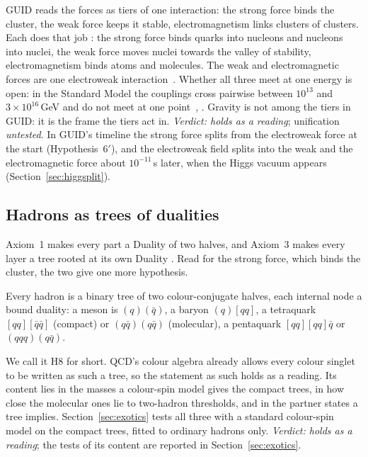 GUID reads the forces as tiers of one interaction: the strong force binds the cluster, the weak force keeps it stable, electromagnetism
links clusters of clusters. Each does that job \tagP: the strong force binds quarks into nucleons and nucleons into nuclei, the weak force
moves nuclei towards the valley of stability, electromagnetism binds atoms and molecules. The weak and electromagnetic forces are one
electroweak interaction~\cite{glashow,weinberg67,salam}. Whether all three meet at one energy is open: in the Standard Model the couplings
cross pairwise between $10^{13}$ and $3\times10^{16}$\,GeV and do not meet at one point~\cite{amaldi}, . Gravity is not among the tiers in GUID: it is the
frame the tiers act in. \emph{Verdict: holds as a reading}; unification \emph{untested}. In GUID's timeline the
strong force splits from the electroweak force at the start (Hypothesis~6$'$), and the electroweak field splits into the weak and the
electromagnetic force about $10^{-11}$\,s later, when the Higgs vacuum appears (Section~\ref{sec:higgsplit}).


\subsection{Hadrons as trees of dualities}\label{sec:trees}

Axiom~1 makes every part a Duality of two halves, and Axiom~3 makes every layer a tree rooted at its own Duality \tagD. Read for the
strong force, which binds the cluster, the two give one more hypothesis.

\begin{hypothesis}\label{h:tree}
Every hadron is a binary tree of two colour-conjugate halves, each internal node a bound duality: a meson is $(q)(\bar q)$, a baryon
$(q)[qq]$, a tetraquark $[qq][\bar q\bar q]$ (compact) or $(q\bar q)(q\bar q)$ (molecular), a pentaquark $[qq][qq]\bar q$ or
$(qqq)(q\bar q)$. \tagH
\end{hypothesis}

\noindent We call it H8 for short. QCD's colour algebra already allows every colour singlet to be written as such a tree, so the statement as such holds as a
reading. Its content lies in the masses a colour-spin model gives the compact trees, in how close the molecular ones lie to two-hadron
thresholds, and in the partner states a tree implies. Section~\ref{sec:exotics} tests all three with a standard colour-spin model on
the compact trees, fitted to ordinary hadrons only. \emph{Verdict: holds as a reading}; the tests of its content are reported in
Section~\ref{sec:exotics}.

